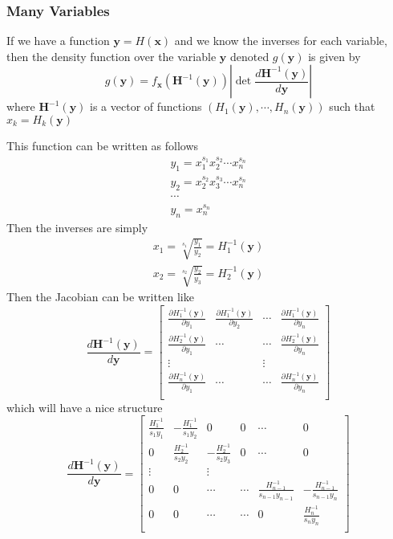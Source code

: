\documentclass[journal=jcisd8,manuscript=article,layout=onecolumn,pdftex,floatfix,amsmath,amssymb,10pt]{achemso}
\begin{document}
\subsubsection{Many Variables}
If we have a function $\mathbf{y} = H(\mathbf{x})$ and we know the inverses for each variable, then the density function over the variable $\mathbf{y}$ denoted $g(\mathbf{y})$ is given by
\begin{equation}
g(\mathbf{y}) = f_{\mathbf{x}}(\mathbf{H}^{-1}(\mathbf{y})) \left| \det \frac{d \mathbf{H}^{-1}(\mathbf{y})}{d \mathbf{y}} \right|
\end{equation}
where $\mathbf{H}^{-1}(\mathbf{y})$ is a vector of functions $(H_1(\mathbf{y}),\cdots,H_n(\mathbf{y}))$ such that $x_k = H_k(\mathbf{y})$

This function can be written as follows
\begin{align*}
y_1 = x_1^{s_1} x_2^{s_2} \cdots x_n^{s_n} \\
y_2 = x_2^{s_2} x_3^{s_3} \cdots x_n^{s_n} \\
\cdots\\
y_n = x_n^{s_n}
\end{align*}
Then the inverses are simply
\begin{align*}
x_1 = \sqrt[s_1]{\frac{y_1}{y_2}}  = H_1^{-1}(\mathbf{y})\\
x_2 = \sqrt[s_2]{\frac{y_2}{y_3}} = H_2^{-1}(\mathbf{y})
\end{align*}
Then the Jacobian can be written like
\begin{equation}
\frac{d \mathbf{H}^{-1}(\mathbf{y})}{d \mathbf{y}} = \begin{bmatrix}
\frac{\partial H_1^{-1}(\mathbf{y})}{\partial y_1} & \frac{\partial H_1^{-1}(\mathbf{y})}{\partial y_2} & \cdots & \frac{\partial H_1^{-1}(\mathbf{y})}{\partial y_n} \\
\frac{\partial H_2^{-1}(\mathbf{y})}{\partial y_1} & \cdots & \cdots & \frac{\partial H_2^{-1}(\mathbf{y})}{\partial y_n} \\
\vdots & & \vdots \\
\frac{\partial H_n^{-1}(\mathbf{y})}{\partial y_1} & \cdots & \cdots & \frac{\partial H_n^{-1}(\mathbf{y})}{\partial y_n} \\
\end{bmatrix}
\end{equation}
which will have a nice structure
\begin{equation}
\frac{d \mathbf{H}^{-1}(\mathbf{y})}{d \mathbf{y}} = \begin{bmatrix}
\frac{H_1^{-1}}{s_1 y_1} & -\frac{H_1^{-1}}{s_1 y_2} & 0 & 0 & \cdots & 0 \\
0 & \frac{H_2^{-1}}{s_2 y_2} & -\frac{H_2^{-1}}{s_2 y_3} & 0 & \cdots &0 \\
\vdots & & \vdots \\
0 & 0 & \cdots & \cdots & \frac{H_{n-1}^{-1}}{s_{n-1} y_{n-1}} & -\frac{H_{n-1}^{-1}}{s_{n-1} y_{n}} \\
0 & 0 & \cdots & \cdots & 0 & \frac{H_n^{-1}}{ s_n y_n} \\
\end{bmatrix}
\end{equation}
\end{document}
